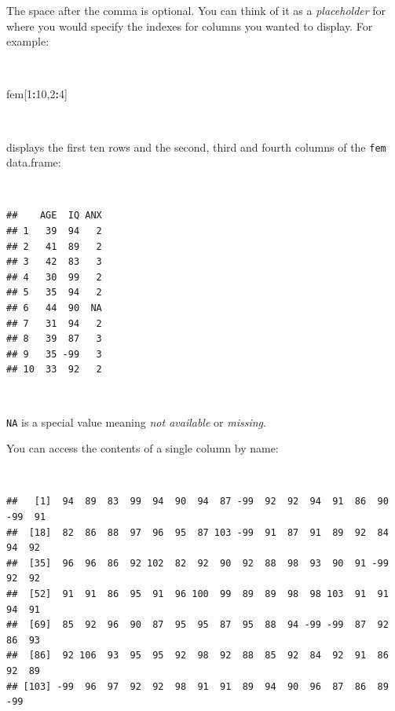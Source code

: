 \documentclass[12pt,a4paper]{book}
\newenvironment{Shaded}{\begin{snugshade}}{\end{snugshade}}
\newcommand{\DecValTok}[1]{\textcolor[rgb]{0.00,0.00,0.81}{#1}}
\newcommand{\NormalTok}[1]{#1}
\newcommand{\OperatorTok}[1]{\textcolor[rgb]{0.81,0.36,0.00}{\textbf{#1}}}
\theoremstyle{definition}
\theoremstyle{definition}
\theoremstyle{definition}
\theoremstyle{remark}
\begin{document}
\newpage

The space after the comma is optional. You can think of it as a
\emph{placeholder} for where you would specify the indexes for columns
you wanted to display. For example:

~

\begin{Shaded}
\begin{Highlighting}[]
\NormalTok{fem[}\DecValTok{1}\OperatorTok{:}\DecValTok{10}\NormalTok{,}\DecValTok{2}\OperatorTok{:}\DecValTok{4}\NormalTok{]}
\end{Highlighting}
\end{Shaded}

~

displays the first ten rows and the second, third and fourth columns of
the \texttt{fem} data.frame:

~

\begin{verbatim}
##    AGE  IQ ANX
## 1   39  94   2
## 2   41  89   2
## 3   42  83   3
## 4   30  99   2
## 5   35  94   2
## 6   44  90  NA
## 7   31  94   2
## 8   39  87   3
## 9   35 -99   3
## 10  33  92   2
\end{verbatim}

~

\texttt{NA} is a special value meaning \emph{not available} or
\emph{missing}.

You can access the contents of a single column by name:

~

\begin{Shaded}
\end{Shaded}

\begin{verbatim}
##   [1]  94  89  83  99  94  90  94  87 -99  92  92  94  91  86  90 -99  91
##  [18]  82  86  88  97  96  95  87 103 -99  91  87  91  89  92  84  94  92
##  [35]  96  96  86  92 102  82  92  90  92  88  98  93  90  91 -99  92  92
##  [52]  91  91  86  95  91  96 100  99  89  89  98  98 103  91  91  94  91
##  [69]  85  92  96  90  87  95  95  87  95  88  94 -99 -99  87  92  86  93
##  [86]  92 106  93  95  95  92  98  92  88  85  92  84  92  91  86  92  89
## [103] -99  96  97  92  92  98  91  91  89  94  90  96  87  86  89 -99
\end{verbatim}

~
\end{document}
